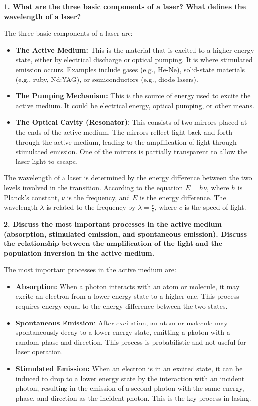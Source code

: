 \documentclass{article}
\begin{document}
\textbf{1. What are the three basic components of a laser? What defines the wavelength of a laser?}

The three basic components of a laser are:

\begin{itemize}
    \item \textbf{The Active Medium:} This is the material that is excited to a higher energy state, either by electrical discharge or optical pumping. It is where stimulated emission occurs. Examples include gases (e.g., He-Ne), solid-state materials (e.g., ruby, Nd:YAG), or semiconductors (e.g., diode lasers).
    \item \textbf{The Pumping Mechanism:} This is the source of energy used to excite the active medium. It could be electrical energy, optical pumping, or other means.
    \item \textbf{The Optical Cavity (Resonator):} This consists of two mirrors placed at the ends of the active medium. The mirrors reflect light back and forth through the active medium, leading to the amplification of light through stimulated emission. One of the mirrors is partially transparent to allow the laser light to escape.
\end{itemize}

The wavelength of a laser is determined by the energy difference between the two levels involved in the transition. According to the equation \( E = h \nu \), where \( h \) is Planck’s constant, \( \nu \) is the frequency, and \( E \) is the energy difference. The wavelength \( \lambda \) is related to the frequency by \( \lambda = \frac{c}{\nu} \), where \( c \) is the speed of light.

\textbf{2. Discuss the most important processes in the active medium (absorption, stimulated emission, and spontaneous emission). Discuss the relationship between the amplification of the light and the population inversion in the active medium.}

The most important processes in the active medium are:

\begin{itemize}
    \item \textbf{Absorption:} When a photon interacts with an atom or molecule, it may excite an electron from a lower energy state to a higher one. This process requires energy equal to the energy difference between the two states.
    \item \textbf{Spontaneous Emission:} After excitation, an atom or molecule may spontaneously decay to a lower energy state, emitting a photon with a random phase and direction. This process is probabilistic and not useful for laser operation.
    \item \textbf{Stimulated Emission:} When an electron is in an excited state, it can be induced to drop to a lower energy state by the interaction with an incident photon, resulting in the emission of a second photon with the same energy, phase, and direction as the incident photon. This is the key process in lasing.
\end{itemize}
\end{document}
